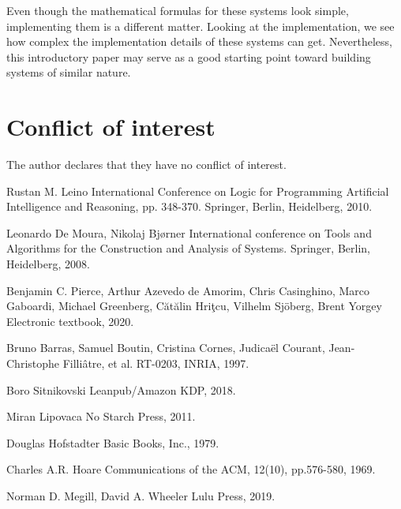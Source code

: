 \documentclass{article}
\begin{document}
Even though the mathematical formulas for these systems look simple, implementing them is a different matter. Looking at the implementation, we see how complex the implementation details of these systems can get. Nevertheless, this introductory paper may serve as a good starting point toward building systems of similar nature.

\section{Conflict of interest}

The author declares that they have no conflict of interest.

\begin{thebibliography}{1}

Rustan M. Leino
\newblock International Conference on Logic for Programming Artificial Intelligence and Reasoning, pp. 348-370. Springer, Berlin, Heidelberg, 2010.

Leonardo De Moura, Nikolaj Bjørner
\newblock International conference on Tools and Algorithms for the Construction and Analysis of Systems. Springer, Berlin, Heidelberg, 2008.

Benjamin C. Pierce, Arthur Azevedo de Amorim, Chris Casinghino, Marco Gaboardi, Michael Greenberg, Cătălin Hriţcu, Vilhelm Sjöberg, Brent Yorgey
\newblock Electronic textbook, 2020.

Bruno Barras, Samuel Boutin, Cristina Cornes, Judicaël Courant, Jean-Christophe Filliâtre, et al.
 RT-0203, INRIA, 1997.

Boro Sitnikovski
\newblock Leanpub/Amazon KDP, 2018.

Miran Lipovaca
\newblock No Starch Press, 2011.

Douglas Hofstadter
\newblock Basic Books, Inc., 1979.

Charles A.R. Hoare
\newblock Communications of the ACM, 12(10), pp.576-580, 1969.

Norman D. Megill, David A. Wheeler
\newblock Lulu Press, 2019.

\end{thebibliography}
\end{document}
